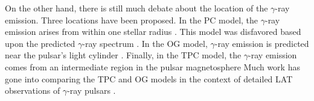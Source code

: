 On the other hand, there is still much debate about the location
of the $\gamma$-ray emission.  Three locations have been proposed.
In the \ac{PC} model, the $\gamma$-ray emission arises from within one
stellar radius \citep{daugherty_1996a_gamma-ray-pulsars:}.  This model
was disfavored based upon the predicted $\gamma$-ray spectrum
\citep{abdo_2009b_fermi-large}.  In the \ac{OG} model,
$\gamma$-ray emission is predicted near the pulsar's light cylinder
\citep{cheng_1986a_energetic-radiation,romani_1996a_gamma-ray-pulsars:}.
Finally, in the \ac{TPC} model, the $\gamma$-ray emission
comes from an intermediate region in the pulsar magnetosphere
\citep{dyks_2003a_two-pole-caustic,muslimov_2004a_high-altitude-particle}
Much work has gone into comparing the \ac{TPC} and
\ac{OG} models in the context of detailed \ac{LAT}
observations of $\gamma$-ray pulsars \citep[See for
example][]{watters_2011a_galactic-population,romani_2011a_sub-luminous-gamma-ray}.
